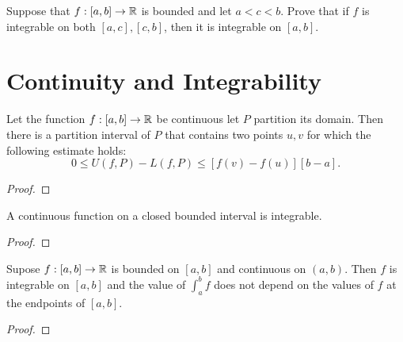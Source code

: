 \documentclass[letterpaper, twoside, 12pt]{book}
\begin{document}
\begin{exercise}[6]
  Suppose that \(f:[a,b]\to\mathbb R\) is bounded and let \(a<c<b\). Prove that if
  \(f\) is integrable on both \([a,c],[c,b]\), then it is integrable on
  \([a,b]\).
\end{exercise}
\begin{solution}

\end{solution}




\section{Continuity and Integrability}


\begin{lemma}[6.17]
  Let the function \(f:[a,b]\to\mathbb R\) be continuous let \(P\) partition
  its domain. Then there is a partition interval of \(P\) that contains two
  points \(u,v\) for which the following estimate holds:
  \[
    0
      \leq
    U(f,P)-L(f,P)
      \leq
    [f(v)-f(u)][b-a]
  .\]
\end{lemma}
\begin{proof}

\end{proof}


\begin{theorem}[6.18]
  A continuous function on a closed bounded interval is integrable.
\end{theorem}
\begin{proof}

\end{proof}


\begin{theorem}[6.19]
  Supose \(f:[a,b]\to\mathbb R\) is bounded on \([a,b]\) and continuous on
  \((a,b)\). Then \(f\) is integrable on \([a,b]\) and the value of
  \(\int_a^b f\) does not depend on the values of \(f\) at the endpoints
  of \([a,b]\).
\end{theorem}
\begin{proof}

\end{proof}
\end{document}
